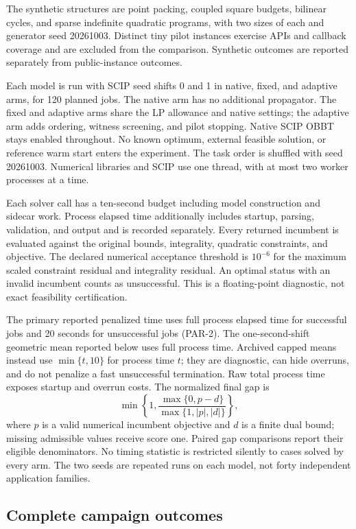 The synthetic structures are point packing, coupled square budgets,
bilinear cycles, and sparse indefinite quadratic programs, with two sizes
of each and generator seed 20261003. Distinct tiny pilot instances
exercise APIs and callback coverage and are excluded from the comparison.
Synthetic outcomes are reported separately from public-instance outcomes.

Each model is run with SCIP seed shifts 0 and 1 in native, fixed, and
adaptive arms, for 120 planned jobs. The native arm has no additional
propagator. The fixed and adaptive arms share the LP allowance and native
settings; the adaptive arm adds ordering, witness screening, and pilot
stopping. Native SCIP OBBT stays enabled throughout. No known optimum,
external feasible solution, or reference warm start enters the experiment.
The task order is shuffled with seed 20261003. Numerical libraries and
SCIP use one thread, with at most two worker processes at a time.

Each solver call has a ten-second budget including model construction and
sidecar work. Process elapsed time additionally includes startup, parsing,
validation, and output and is recorded separately. Every returned
incumbent is evaluated against the original bounds, integrality,
quadratic constraints, and objective. The declared numerical acceptance
threshold is $10^{-6}$ for the maximum scaled constraint residual and
integrality residual. An optimal status with an invalid incumbent counts
as unsuccessful. This is a floating-point diagnostic, not exact
feasibility certification.

The primary reported penalized time uses full process elapsed time for
successful jobs and 20 seconds for unsuccessful jobs (PAR-2). The
one-second-shift geometric mean reported below uses full process time.
Archived capped means instead use $\min\{t,10\}$ for process time $t$;
they are diagnostic, can hide overruns, and do not penalize a fast
unsuccessful termination. Raw total process time exposes startup
and overrun costs. The normalized final gap is
\[
 \min\left\{1,\frac{\max\{0,p-d\}}{\max\{1,|p|,|d|\}}\right\},
\]
where $p$ is a valid numerical incumbent objective and $d$ is a finite
dual bound; missing admissible values receive score one. Paired gap
comparisons report their eligible denominators. No timing statistic is
restricted silently to cases solved by every arm. The two seeds are
repeated runs on each model, not forty independent application families.

\subsection{Complete campaign outcomes}

